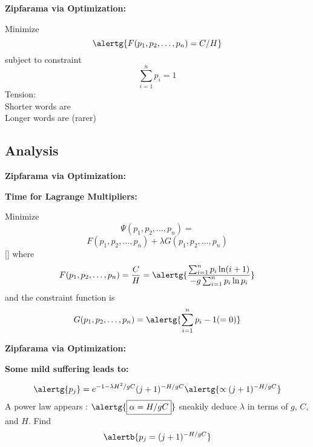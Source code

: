   



  \textbf{Zipfarama via Optimization:}

  
  
   Minimize 
    $$ \alertg{F(p_1,p_2,\ldots,p_n) = C/H} $$
    subject to constraint
    $$ \sum_{i=1}^n p_i = 1 $$
   Tension: \\
     Shorter words are \\
    { Longer words are  (rarer)}
  
  



\subsection{Analysis}

  \textbf{Zipfarama via Optimization:}

  \textbf{Time for Lagrange Multipliers:}
    
    
      Minimize
      $$
      \Psi(p_1,p_2,\ldots,p_n) = 
      $$
      $$
      F(p_1,p_2,\ldots,p_n) + \lambda G(p_1,p_2,\ldots,p_n)
      $$
    []
      where
      $$
      F(p_1,p_2,\ldots,p_n)
      = 
      \frac{C}{H}
      =
      \alertg{
        \frac{\sum_{i=1}^n p_i \ln (i+1)}
        {-g\sum_{i=1}^n p_i \ln p_i}
      }
      $$
      and the
      constraint function is
      $$
      G(p_1,p_2,\ldots,p_n) = \alertg{\sum_{i=1}^n p_i - 1  (= 0)}
      $$
    
    {
      \large
    }
  
  

  \textbf{Zipfarama via Optimization:}

  \textbf{Some mild suffering leads to:}
    
    
      $$
      \alertg{p_j} = e^{-1 -\lambda H^2/gC} (j+1)^{-H/gC} {\alertg{\propto (j+1)^{-H/gC}}}
      $$
     A power law appears \alertg{[applause]}: $\alertg{\boxed{\alpha = H/gC}}$
      sneakily deduce $\lambda$ in terms of $g$, $C$, and $H$.
     Find
      $$
      \alertb{p_j = (j+1)^{-H/gC}}
      $$
    
  

  

